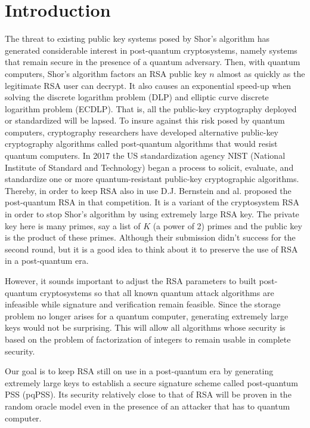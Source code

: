 \documentclass[a4paper,11pt]{article}
\begin{document}
\section{Introduction}
The threat to existing public key systems posed by Shor's algorithm \cite{Shor} has generated considerable interest in post-quantum cryptosystems, namely systems that remain secure in the presence of a quantum adversary. Then, with quantum computers, Shor's algorithm factors an RSA public key $n$ almost as quickly as the legitimate RSA user can decrypt. It also causes an exponential speed-up when solving the discrete logarithm problem (DLP) and elliptic curve discrete logarithm problem (ECDLP). That is, all the public-key cryptography deployed or standardized will be lapsed. To insure against this risk posed by quantum computers, cryptography
researchers have developed alternative public-key cryptography algorithms called
post-quantum algorithms that would resist quantum computers. In 2017 the US standardization
agency NIST (National Institute of Standard and Technology) began a process to solicit, evaluate, and standardize one or more quantum-resistant public-key cryptographic algorithms. Thereby, in order to keep RSA also in use D.J. Bernstein and al. proposed the post-quantum RSA \cite{pqRSA} in that competition. It is a variant of the cryptosystem RSA in order to stop Shor's algorithm by using extremely large RSA key. The private key here is many primes, say a list of $K$ (a power of 2) primes and the public key is the product of these primes. Although their submission didn't success for the second round, but it is a good idea to think about it to preserve the use of RSA in a post-quantum era. 

However, it sounds important to adjust the RSA parameters to built post-quantum cryptosystems so that all known quantum attack algorithms are infeasible while signature and verification remain feasible. Since the storage problem no longer arises for a quantum computer, generating extremely large keys would not be surprising. This will allow all algorithms whose security is based on the problem of factorization of integers to remain usable in complete security.


  Our goal is to keep RSA still on use in a post-quantum era by generating extremely large keys to establish a secure signature scheme called post-quantum PSS (pqPSS). Its security relatively close to that of RSA will be proven in the random oracle model even in the presence of an attacker that has to quantum computer.
  
\end{document}
